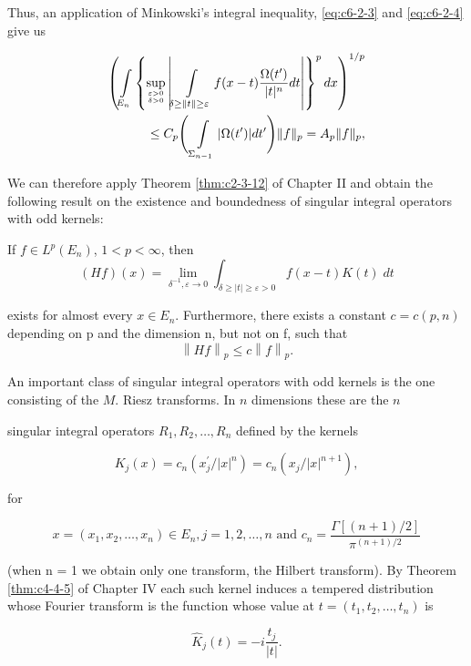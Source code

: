 Thus, an application of Minkowski's integral inequality, \eqref{eq:c6-2-3} and \eqref{eq:c6-2-4} give us

\begin{equation}\label{eq:c6-2-5}
\begin{aligned}\left(\int\limits_{E_{n}}\left\{\sup_{\varepsilon>0\atop\delta>0}\left|\int\limits_{\delta\geq\|t\|\geq\varepsilon}f(x-t)\frac{\Omega(t^{\prime})}{|t|^{n}}dt\right|\right\}^{p} dx\right)^{1/p}\\\leq C_{p}\Bigg(\int\limits_{\Sigma_{n-1}}|\Omega(t^{\prime})|dt^{\prime}\Bigg)\|f\|_{p}=A_{p}\|f\|_{p},\end{aligned}
\end{equation}

We can therefore apply Theorem \ref{thm:c2-3-12} of Chapter II and obtain the following result on the existence and boundedness of singular integral operators with odd kernels:

\begin{theorem}
\label{thm:c6-2-6}
If $f \in L^p(E_n)$, $1 < p < \infty$, then
\[
(H f)(x)=\lim_{\delta^{-1},\varepsilon\to0}\int_{\delta\geq|t|\geq\varepsilon>0}f(x-t)K(t)\;{d}t
\]

exists for almost every $x \in E_n$. Furthermore, there exists a constant $c = c(p, n)$ depending on p and the dimension n, but not on f, such that
\[
\left\|H f\right\|_{p}\leq c\left\|f\right\|_{p}.
\]

\end{theorem}

An important class of singular integral operators with odd kernels is the one consisting of the $M$. Riesz transforms. In $n$ dimensions these are the $n$

singular integral operators $R_{1}, R_{2}, \ldots, R_{n}$ defined by the kernels

\[
K_{j}(x)=c_{n}(x_{j}^{\prime}/|x|^{n})=c_{n}(x_{j}/|x|^{n+1}),
\]

for

\[
x=(x_{1},x_{2},\ldots,x_{n})\in E_{n},j=1,2,\ldots,n\text{ and }c_{n}=\frac{\Gamma[(n+1)/2]}{\pi^{(n+1)/2}}
\]

(when n = 1 we obtain only one transform, the Hilbert transform). By Theorem \ref{thm:c4-4-5} of Chapter IV each such kernel induces a tempered distribution whose Fourier transform is the function whose value at $t = (t_1, t_2, \ldots, t_n)$ is

\[
\hat{K}_{j}(t)=-i\frac{t_{j}}{|t|}.
\]

